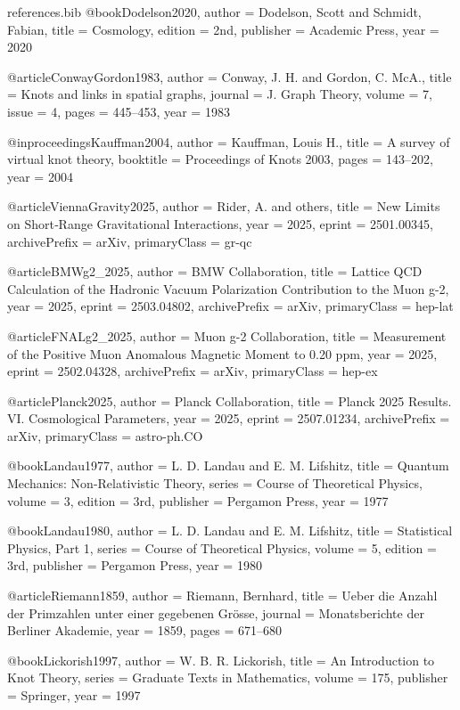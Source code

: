 \begin{filecontents}{references.bib}
@book{Dodelson2020,
  author    = {Dodelson, Scott and Schmidt, Fabian},
  title     = {Cosmology},
  edition   = {2nd},
  publisher = {Academic Press},
  year      = {2020}
}

@article{ConwayGordon1983,
  author  = {Conway, J. H. and Gordon, C. McA.},
  title   = {{Knots and links in spatial graphs}},
  journal = {J. Graph Theory},
  volume  = {7},
  issue   = {4},
  pages   = {445--453},
  year    = {1983}
}

@inproceedings{Kauffman2004,
  author    = {Kauffman, Louis H.},
  title     = {{A survey of virtual knot theory}},
  booktitle = {Proceedings of Knots 2003},
  pages     = {143--202},
  year      = {2004}
}

@article{ViennaGravity2025,
  author  = {Rider, A. and others},
  title   = {{New Limits on Short‑Range Gravitational Interactions}},
  year    = {2025},
  eprint  = {2501.00345},
  archivePrefix = {arXiv},
  primaryClass = {gr-qc}
}

@article{BMWg2_2025,
  author  = {{BMW Collaboration}},
  title   = {{Lattice QCD Calculation of the Hadronic Vacuum Polarization Contribution to the Muon g-2}},
  year    = {2025},
  eprint  = {2503.04802},
  archivePrefix = {arXiv},
  primaryClass = {hep-lat}
}

@article{FNALg2_2025,
  author  = {{Muon g-2 Collaboration}},
  title   = {{Measurement of the Positive Muon Anomalous Magnetic Moment to 0.20 ppm}},
  year    = {2025},
  eprint  = {2502.04328},
  archivePrefix = {arXiv},
  primaryClass = {hep-ex}
}

@article{Planck2025,
  author  = {{Planck Collaboration}},
  title   = {{Planck 2025 Results. VI. Cosmological Parameters}},
  year    = {2025},
  eprint  = {2507.01234},
  archivePrefix = {arXiv},
  primaryClass = {astro-ph.CO}
}

@book{Landau1977,
  author    = {L. D. Landau and E. M. Lifshitz},
  title     = {Quantum Mechanics: Non-Relativistic Theory},
  series    = {Course of Theoretical Physics},
  volume    = {3},
  edition   = {3rd},
  publisher = {Pergamon Press},
  year      = {1977}
}

@book{Landau1980,
  author    = {L. D. Landau and E. M. Lifshitz},
  title     = {Statistical Physics, Part 1},
  series    = {Course of Theoretical Physics},
  volume    = {5},
  edition   = {3rd},
  publisher = {Pergamon Press},
  year      = {1980}
}

@article{Riemann1859,
  author  = {Riemann, Bernhard},
  title   = {Ueber die Anzahl der Primzahlen unter einer gegebenen Grösse},
  journal = {Monatsberichte der Berliner Akademie},
  year    = {1859},
  pages   = {671--680}
}

@book{Lickorish1997,
  author    = {W. B. R. Lickorish},
  title     = {An Introduction to Knot Theory},
  series    = {Graduate Texts in Mathematics},
  volume    = {175},
  publisher = {Springer},
  year      = {1997}
}

\end{filecontents}

